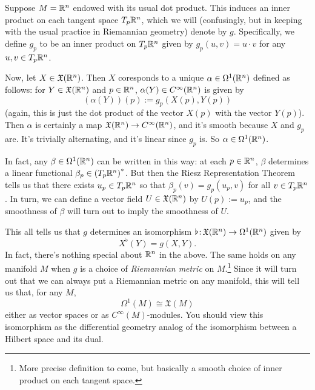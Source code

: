 \begin{example}\label{ex:vector fields and 1-forms}
	Suppose $M = \mathbb{R}^n$ endowed with its usual dot product. This induces an inner product on each tangent space $T_p \mathbb{R}^n$, which we will (confusingly, but in keeping with the usual practice in Riemannian geometry) denote by $g$. Specifically, we define $g_p$ to be an inner product on $T_p\mathbb{R}^n$ given by $g_p(u,v) = u \cdot v$ for any $u,v \in T_p\mathbb{R}^n$.
	
	Now, let $X \in \mathfrak{X}(\mathbb{R}^n)$. Then $X$ coresponds to a unique $\alpha \in \Omega^1(\mathbb{R}^n)$ defined as follows: for $Y \in \mathfrak{X}(\mathbb{R}^n)$ and $p \in \mathbb{R}^n$, $\alpha(Y) \in C^\infty(\mathbb{R}^n)$ is given by
	\[
		(\alpha(Y))(p) := g_p(X(p), Y(p))
	\]
	(again, this is just the dot product of the vector $X(p)$ with the vector $Y(p)$). Then $\alpha$ is certainly a map $\mathfrak{X}(\mathbb{R}^n) \to C^\infty(\mathbb{R}^n)$, and it's smooth because $X$ and $g_p$ are. It's trivially alternating, and it's linear since $g_p$ is. So $\alpha \in \Omega^1(\mathbb{R}^n)$.
	
	In fact, any $\beta \in \Omega^1(\mathbb{R}^n)$ can be written in this way: at each $p \in \mathbb{R}^n$, $\beta$ determines a linear functional $\beta_p \in \left(T_p\mathbb{R}^n\right)^\ast$. But then the Riesz Representation Theorem tells us that there exists $u_p \in T_p \mathbb{R}^n$ so that $\beta_p(v) = g_p(u_p,v)$ for all $v \in T_p\mathbb{R}^n$. In turn, we can define a vector field $U \in \mathfrak{X}(\mathbb{R}^n)$ by $U(p) := u_p$, and the smoothness of $\beta$ will turn out to imply the smoothness of $U$. 
	
	This all tells us that $g$ determines an isomorphism $\flat \colon\thinspace\!\! \mathfrak{X}(\mathbb{R}^n) \to \Omega^1(\mathbb{R}^n)$ given by
	\[
		X^\flat(Y) = g(X,Y).
	\]
	In fact, there's nothing special about $\mathbb{R}^n$ in the above. The same holds on any manifold $M$ when $g$ is a choice of \emph{Riemannian metric} on $M$.\footnote{More precise definition to come, but basically a smooth choice of inner product on each tangent space.} Since it will turn out that we can always put a Riemannian metric on any manifold, this will tell us that, for any $M$,
	\[
		\Omega^1(M) \cong \mathfrak{X}(M)
	\]
	either as vector spaces or as $C^\infty(M)$-modules. You should view this isomorphism as the differential geometry analog of the isomorphism between a Hilbert space and its dual.
\end{example}

